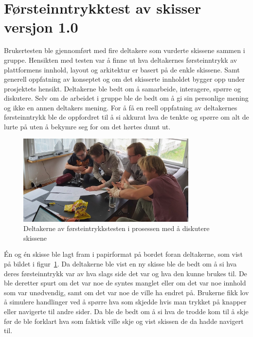 
\section{Førsteinntrykktest av skisser versjon 1.0}
\label{section:brukertest-skisser-1}

Brukertesten ble gjennomført med fire deltakere som vurderte skissene sammen i gruppe. Hensikten med testen var å finne ut hva deltakernes førsteinntrykk av plattformens innhold, layout og arkitektur er basert på de enkle skissene. Samt generell oppfatning av konseptet og om det skisserte innholdet bygger opp under prosjektets hensikt. Deltakerne ble bedt om å samarbeide, interagere, spørre og diskutere. Selv om de arbeidet i gruppe ble de bedt om å gi sin personlige mening og ikke  en annen deltakers mening. For å få en reell oppfatning av deltakernes førsteinntrykk ble de oppfordret til å si akkurat hva de tenkte og spørre om alt de lurte på uten å bekymre seg for om det hørtes dumt ut.


\begin{figure}[H]
\includegraphics[width=0.8\textwidth]{Illustrasjoner/skissetest-bilde.jpg}
\centering
\caption{Deltakerne av førsteintrykkstesten i prosessen med å diskutere skissene}
\label{fig:skissetest}
\end{figure}

Én og én skisse ble lagt fram i papirformat på bordet foran deltakerne, som vist på bildet i figur~\ref{fig:skissetest}. Da deltakerne ble vist en ny skisse ble de bedt om å si hva deres førsteinntrykk var av hva slags side det var og hva den kunne brukes til. De ble deretter spurt om det var noe de syntes manglet eller om det var noe innhold som var unødvendig, samt om det var noe de ville ha endret på. Brukerne fikk lov å simulere handlinger ved å spørre hva som skjedde hvis man trykket på knapper eller navigerte til andre sider. Da ble de bedt om å si hva de trodde kom til å skje før de ble forklart hva som faktisk ville skje og vist skissen de da hadde navigert til.

